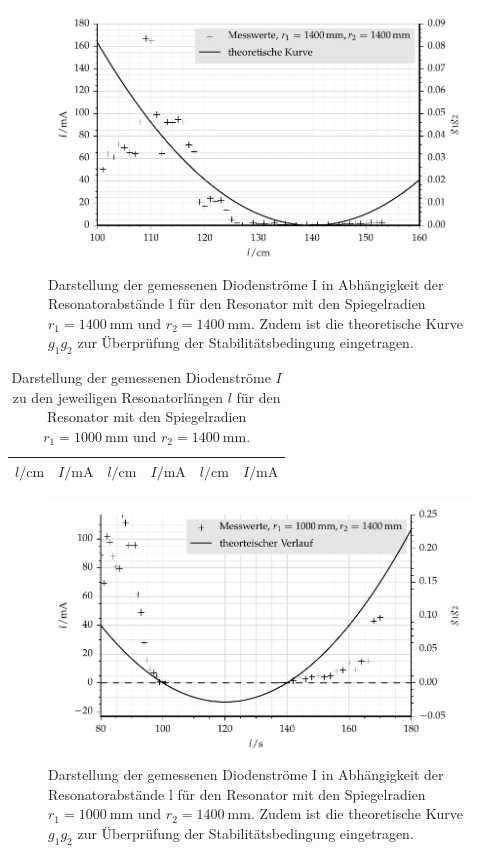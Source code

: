 \begin{figure}[hb]
	\centering
	\includegraphics{bilder/fig_S1.pdf}
	\caption{Darstellung der gemessenen Diodenströme I in Abhängigkeit der
	Resonatorabstände l für den Resonator mit den Spiegelradien
	$r_1 = \SI{1400}{\milli\meter}$ und $r_2 = \SI{1400}{\milli\meter}$. Zudem
	ist die theoretische Kurve $g_1g_2$ zur Überprüfung der Stabilitätsbedingung
	eingetragen.}
	\label{fig:S1}
\end{figure}

\clearpage
\begin{table}
	\centering
	\begin{tabular}{cc|cc|cc}
		\midrule
		\midrule
		$l/\si{\cm}$ & $I/\si{\mA}$ & $l/\si{\cm}$ & $I/\si{\mA}$ &
		$l/\si{\cm}$ & $I/\si{\mA}$ \\
		\midrule
		
		\midrule
		\midrule
	\end{tabular}
	\caption{Darstellung der gemessenen Diodenströme $I$ zu den jeweiligen
		Resonatorlängen $l$ für den Resonator mit den Spiegelradien
		$r_1 = \SI{1000}{\milli\meter}$ und $r_2 = \SI{1400}{\milli\meter}$.}
	\label{tab:S2}
\end{table}

\begin{figure}[h!]
	\centering
	\includegraphics{bilder/fig_S2.pdf}
	\caption{Darstellung der gemessenen Diodenströme I in Abhängigkeit der
	Resonatorabstände l für den Resonator mit den Spiegelradien
	$r_1 = \SI{1000}{\milli\meter}$ und $r_2 = \SI{1400}{\milli\meter}$. Zudem
	ist die theoretische Kurve $g_1g_2$ zur Überprüfung der Stabilitätsbedingung
	eingetragen.}
	\label{fig:S2}
\end{figure}

